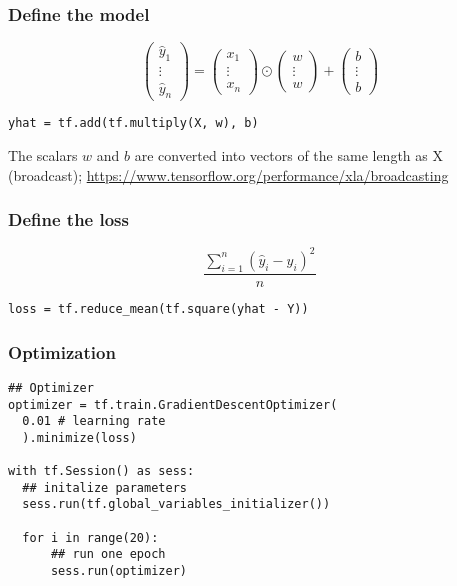 \documentclass{beamer}
\begin{document}
\begin{frame}[fragile]
\frametitle{Define the model}

\begin{displaymath}
  \begin{pmatrix} \hat{y}_1\\\vdots\\\hat{y}_n\end{pmatrix} =
  \begin{pmatrix} x_1\\\vdots\\x_n\end{pmatrix} \odot
  \begin{pmatrix} w\\\vdots\\w\end{pmatrix} +
  \begin{pmatrix} b\\\vdots\\b\end{pmatrix}
\end{displaymath}

\begin{lstlisting}
yhat = tf.add(tf.multiply(X, w), b)
\end{lstlisting}

{\footnotesize The scalars $w$ and $b$ are converted into vectors of the same
length as X (broadcast); \url{https://www.tensorflow.org/performance/xla/broadcasting}}

\end{frame}

\begin{frame}[fragile]
\frametitle{Define the loss}

\begin{displaymath}
  \frac{\sum^n_{i=1} (\hat{y}_i - y_i)^2}{n}
\end{displaymath}

\begin{lstlisting}
loss = tf.reduce_mean(tf.square(yhat - Y))
\end{lstlisting}

\end{frame}


\begin{frame}[fragile]
\frametitle{Optimization}

\begin{lstlisting}
## Optimizer
optimizer = tf.train.GradientDescentOptimizer(
  0.01 # learning rate
  ).minimize(loss)

with tf.Session() as sess:
  ## initalize parameters
  sess.run(tf.global_variables_initializer())

  for i in range(20):
      ## run one epoch
      sess.run(optimizer)
\end{lstlisting}

\end{frame}
\end{document}
